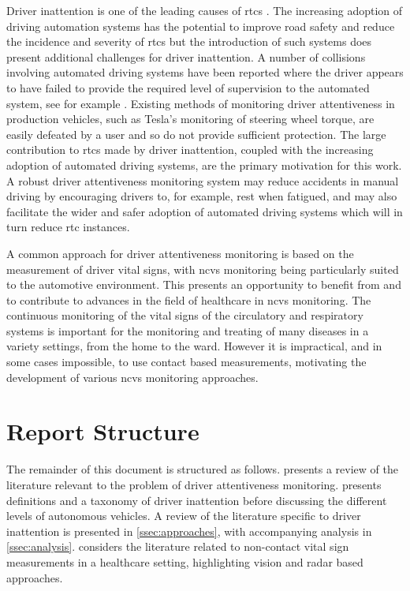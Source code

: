 \documentclass[11pt, parskip=half*,twoside=false]{scrbook}
\begin{document}
Driver inattention is one of the leading causes of \glspl{rtc} \citep{petridouHumanFactorsCausation2000,youngDriverDistraction2007,olsonDriverDistractionCommercial2009}. The increasing adoption of driving automation systems has the potential to improve road safety and reduce the incidence and severity of \glspl{rtc} \citep{favaroExaminingAccidentReports2017} but the introduction of such systems does present additional challenges for driver inattention. A number of collisions involving automated driving systems have been reported where the driver appears to have failed to provide the required level of supervision to the automated system, see for example \citep{ntsbCollisionSportUtility2019,ntsbCollisionCarOperating2019}. Existing methods of monitoring driver attentiveness in production vehicles, such as Tesla's monitoring of steering wheel torque, are easily defeated by a user and so do not provide sufficient protection. The large contribution to \glspl{rtc} made by driver inattention, coupled with the increasing adoption of automated driving systems, are the primary motivation for this work. A robust driver attentiveness monitoring system may reduce accidents in manual driving by encouraging drivers to, for example, rest when fatigued, and may also facilitate the wider and safer adoption of automated driving systems which will in turn reduce \gls{rtc} instances. 

A common approach for driver attentiveness monitoring is based on the measurement of driver vital signs, with \gls{ncvs} monitoring being particularly suited to the automotive environment. This presents an opportunity to benefit from and to contribute to advances in the field of healthcare in \gls{ncvs} monitoring. The continuous monitoring of the vital signs of the circulatory and respiratory systems is important for the monitoring and treating of many diseases in a variety settings, from the home to the ward. However it is impractical, and in some cases impossible, to use contact based measurements, motivating the development of various \gls{ncvs} monitoring approaches. 


\section{Report Structure} \label{sec:struct}
The remainder of this document is structured as follows.  presents a review of the literature relevant to the problem of driver attentiveness monitoring.  presents definitions and a taxonomy of driver inattention before discussing the different levels of autonomous vehicles. A review of the literature specific to driver inattention is presented in \cref{ssec:approaches}, with accompanying analysis in \cref{ssec:analysis}.   considers the literature related to non-contact vital sign measurements in a healthcare setting, highlighting vision and radar based approaches.  
\end{document}
